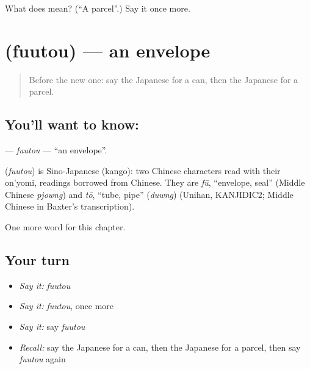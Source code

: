 \begin{tcolorbox}[breakable,colback=teal!4,colframe=teal!35!black,title={Before you move on}]
What does  mean? (\textquotedblleft{}A parcel\textquotedblright{}.) Say it once more.
\end{tcolorbox}
\section[\texorpdfstring{\ja{ふうとう} (fuutou)}{ふうとう (fuutou)}]{ (fuutou) — an envelope}

\label{lesson:JA-C104-fuutou}



\begin{quote}
Before the new one: say the Japanese for a can, then the Japanese for a parcel.
\end{quote}

\subsection*{You'll want to know: }
\textbf{} — \emph{fuutou} — \textquotedblleft{}an envelope\textquotedblright{}.

\begin{cousinweb}
\textbf{} (\emph{fuutou}) is Sino-Japanese (kango): two Chinese characters read with their on'yomi, readings borrowed from Chinese. They are \emph{fū}, \textquotedblleft{}envelope, seal\textquotedblright{} (Middle Chinese \emph{pjowng}) and \emph{tō}, \textquotedblleft{}tube, pipe\textquotedblright{} (\emph{duwng}) (Unihan, KANJIDIC2; Middle Chinese in Baxter's transcription).
\end{cousinweb}

\begin{grammarlens}[title={What you've built}]
One more word for this chapter.
\end{grammarlens}

\subsection*{Your turn}
\begin{itemize}
\raggedright
  \item \emph{Say it:} \emph{fuutou}
  \item \emph{Say it:} \emph{fuutou}, once more
  \item \emph{Say it:} say \emph{fuutou}
  \item \emph{Recall:} say the Japanese for a can, then the Japanese for a parcel, then say \emph{fuutou} again
\end{itemize}

